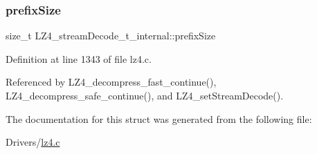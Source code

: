 \mbox{\label{structLZ4__streamDecode__t__internal_a44f5f7acc14c2bb3865eccd5372107c4}} 
\subsubsection{\texorpdfstring{prefix\+Size}{prefixSize}}
{\footnotesize\ttfamily size\+\_\+t L\+Z4\+\_\+stream\+Decode\+\_\+t\+\_\+internal\+::prefix\+Size}



Definition at line 1343 of file lz4.\+c.



Referenced by L\+Z4\+\_\+decompress\+\_\+fast\+\_\+continue(), L\+Z4\+\_\+decompress\+\_\+safe\+\_\+continue(), and L\+Z4\+\_\+set\+Stream\+Decode().



The documentation for this struct was generated from the following file\+:\begin{DoxyCompactItemize}
\item 
Drivers/\hyperlink{lz4_8c}{lz4.\+c}\end{DoxyCompactItemize}
